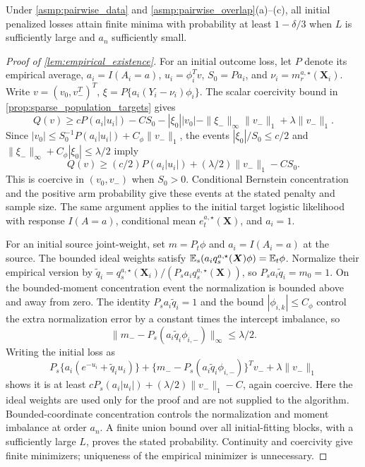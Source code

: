 \documentclass[12pt]{article}
\begin{document}
\begin{lemma}\label{lem:empirical_existence}
Under \cref{asmp:pairwise_data} and \cref{asmp:pairwise_overlap}(a)--(c), all initial penalized losses attain finite minima with probability at least $1-\delta/3$ when $L$ is sufficiently large and $a_n$ sufficiently small.
\end{lemma}
\begin{proof}[Proof of \cref{lem:empirical_existence}]
For an initial outcome loss, let $P$ denote its empirical average, $a_i=I(A_i=a)$, $u_i=\phi_i^Tv$, $S_0=P a_i$, and $\nu_i=m_r^{a,\star}(\boldsymbol X_i)$. Write $v=(v_0,v_-^T)^T$, $\xi=P\{a_i(Y_i-\nu_i)\phi_i\}$. The scalar coercivity bound in \cref{prop:sparse_population_targets} gives
\[
Q(v)\ge cP(a_i|u_i|)-C S_0
-|\xi_0||v_0|-\|\xi_-\|_\infty\|v_-\|_1
+\lambda\|v_-\|_1.
\]
Since $|v_0|\le S_0^{-1}P(a_i|u_i|)+C_\phi\|v_-\|_1$, the events
$|\xi_0|/S_0\le c/2$ and $\|\xi_-\|_\infty+C_\phi|\xi_0|\le\lambda/2$ imply
\[
Q(v)\ge (c/2)P(a_i|u_i|)+(\lambda/2)\|v_-\|_1-C S_0.
\]
This is coercive in $(v_0,v_-)$ when $S_0>0$. Conditional Bernstein concentration and the positive arm probability give these events at the stated penalty and sample size. The same argument applies to the initial target logistic likelihood with response $I(A=a)$, conditional mean $e_t^{a,\star}(\boldsymbol X)$, and $a_i=1$.

For an initial source joint-weight, set $m=P_t\phi$ and $a_i=I(A_i=a)$ at the source. The bounded ideal weights satisfy $\mathbb{E}_s(a_iq_s^{a,\star}(\boldsymbol X)\phi)=\mathbb{E}_t\phi$. Normalize their empirical version by $\widetilde q_i=q_s^{a,\star}(\boldsymbol X_i)/(P_s a_iq_s^{a,\star}(\boldsymbol X))$, so $P_s a_i\widetilde q_i=m_0=1$. On the bounded-moment concentration event the normalization is bounded above and away from zero. The identity $P_s a_i\widetilde q_i=1$ and the bound $|\phi_{i,k}|\le C_\phi$ control the extra normalization error by a constant times the intercept imbalance, so
\[
\|m_- -P_s(a_i\widetilde q_i\phi_{i,-})\|_\infty\le\lambda/2.
\]
Writing the initial loss as
\[
P_s\{a_i(e^{-u_i}+\widetilde q_i u_i)\}
+\{m_- -P_s(a_i\widetilde q_i\phi_{i,-})\}^Tv_-
+\lambda\|v_-\|_1
\]
shows it is at least $cP_s(a_i|u_i|)+(\lambda/2)\|v_-\|_1-C$, again coercive. Here the ideal weights are used only for the proof and are not supplied to the algorithm. Bounded-coordinate concentration controls the normalization and moment imbalance at order $a_n$. A finite union bound over all initial-fitting blocks, with a sufficiently large $L$, proves the stated probability. Continuity and coercivity give finite minimizers; uniqueness of the empirical minimizer is unnecessary.
\end{proof}
\end{document}
